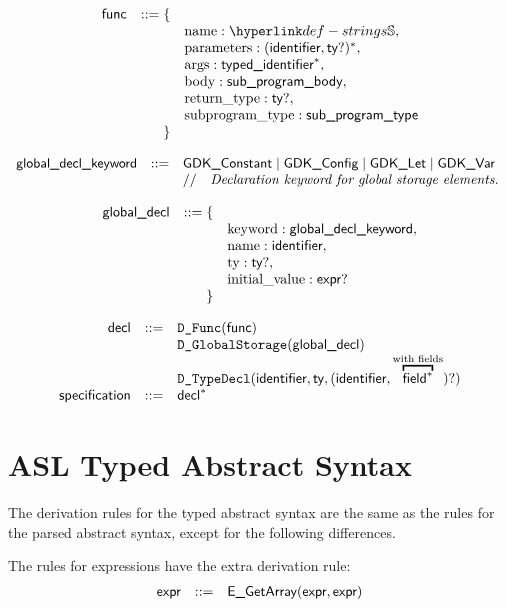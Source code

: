 \documentclass{book}
\begin{document}
\[
\begin{array}{rrl}
\func &::= \{& \\
 & & \funcname : \Strings, \\
 & & \funcparameters : (\identifier, \ty?)^*,\\
 & & \funcargs : \typedidentifier^*,\\
 & & \funcbody : \subprogrambody,\\
 & & \funcreturntype : \ty?,\\
 & & \funcsubprogramtype : \subprogramtype\\
 & \} &
\end{array}
\]

\[
\begin{array}{rcl}
\textsf{global\_decl\_keyword} &::=& \textsf{GDK\_Constant} \;|\; \textsf{GDK\_Config} \;|\; \textsf{GDK\_Let} \;|\; \textsf{GDK\_Var}\\
  & & //\quad\textit{Declaration keyword for global storage elements.}\ \\
\end{array}
\]

\[
\begin{array}{rrl}
\textsf{global\_decl} &::= \{& \\
 & & \text{keyword} : \textsf{global\_decl\_keyword}, \\
 & & \text{name} : \textsf{identifier},\\
 & & \text{ty} : \textsf{ty}?,\\
 & & \text{initial\_value} : \textsf{expr}?\\
 & \} &
\end{array}
\]

\[
\begin{array}{rcl}
\decl &::=& \DFunc(\func)\\
  & & \DGlobalStorage(\globaldecl)\\
  & & \DTypeDecl(\identifier, \ty, (\identifier, \overtext{\Field^*}{with fields})?)\\
\specification &::=& \decl^*\\
\end{array}
\]

\section{ASL Typed Abstract Syntax}

The derivation rules for the typed abstract syntax are the same as the rules for the parsed abstract syntax,
except for the following differences.

The rules for expressions have the extra derivation rule:
\[
\begin{array}{rcl}
\textsf{expr} &::=& \textsf{E\_GetArray}(\textsf{expr}, \textsf{expr}) \\
\end{array}
\]
\end{document}

